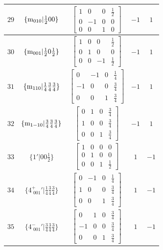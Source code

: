 \documentclass[fleqn,8pt]{jsarticle}
\begin{document}
\begin{longtable}{ccccc}
$ 29 $ & $ \{{\rm m}_{010}|\frac{1}{2} 0 0\} $ & $ \begin{bmatrix} 1 & 0 & 0 & \frac{1}{2} \\ 0 & -1 & 0 & 0 \\ 0 & 0 & 1 & 0 \end{bmatrix} $ & $ -1 $ & $ 1 $ \\ \hline
$ 30 $ & $ \{{\rm m}_{001}|\frac{1}{2} 0 \frac{1}{2}\} $ & $ \begin{bmatrix} 1 & 0 & 0 & \frac{1}{2} \\ 0 & 1 & 0 & 0 \\ 0 & 0 & -1 & \frac{1}{2} \end{bmatrix} $ & $ -1 $ & $ 1 $ \\ \hline
$ 31 $ & $ \{{\rm m}_{110}|\frac{1}{4} \frac{3}{4} \frac{3}{4}\} $ & $ \begin{bmatrix} 0 & -1 & 0 & \frac{1}{4} \\ -1 & 0 & 0 & \frac{3}{4} \\ 0 & 0 & 1 & \frac{3}{4} \end{bmatrix} $ & $ -1 $ & $ 1 $ \\ \hline
$ 32 $ & $ \{{\rm m}_{1-10}|\frac{3}{4} \frac{3}{4} \frac{3}{4}\} $ & $ \begin{bmatrix} 0 & 1 & 0 & \frac{3}{4} \\ 1 & 0 & 0 & \frac{3}{4} \\ 0 & 0 & 1 & \frac{3}{4} \end{bmatrix} $ & $ -1 $ & $ 1 $ \\ \hline
$ 33 $ & $ \{1{}'|0 0 \frac{1}{2}\} $ & $ \begin{bmatrix} 1 & 0 & 0 & 0 \\ 0 & 1 & 0 & 0 \\ 0 & 0 & 1 & \frac{1}{2} \end{bmatrix} $ & $ 1 $ & $ -1 $ \\ \hline
$ 34 $ & $ \{4^{+}_{\,\,001}{}'|\frac{1}{4} \frac{3}{4} \frac{3}{4}\} $ & $ \begin{bmatrix} 0 & -1 & 0 & \frac{1}{4} \\ 1 & 0 & 0 & \frac{3}{4} \\ 0 & 0 & 1 & \frac{3}{4} \end{bmatrix} $ & $ 1 $ & $ -1 $ \\ \hline
$ 35 $ & $ \{4^{-}_{\,\,001}{}'|\frac{3}{4} \frac{3}{4} \frac{3}{4}\} $ & $ \begin{bmatrix} 0 & 1 & 0 & \frac{3}{4} \\ -1 & 0 & 0 & \frac{3}{4} \\ 0 & 0 & 1 & \frac{3}{4} \end{bmatrix} $ & $ 1 $ & $ -1 $ \\ \hline

\end{longtable}
\end{document}
